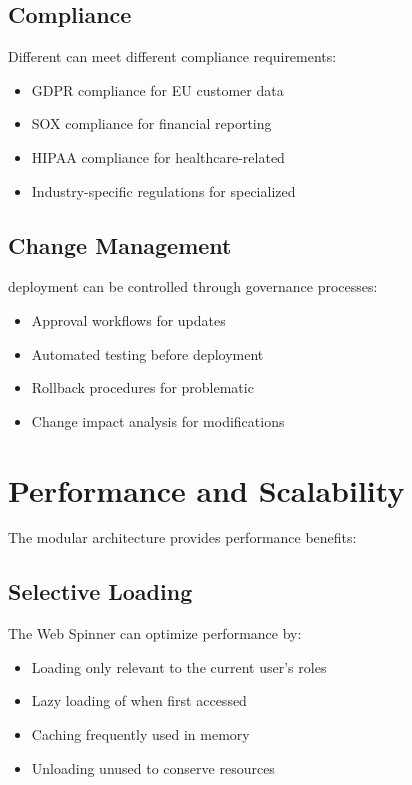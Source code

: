 \subsection{Compliance}

Different  can meet different compliance requirements:
\begin{itemize}
\item GDPR compliance for EU customer data 
\item SOX compliance for financial reporting 
\item HIPAA compliance for healthcare-related 
\item Industry-specific regulations for specialized 
\end{itemize}

\subsection{Change Management}

\webbaselet{} deployment can be controlled through governance processes:
\begin{itemize}
\item Approval workflows for \webbaselet{} updates
\item Automated testing before \webbaselet{} deployment
\item Rollback procedures for problematic 
\item Change impact analysis for \webbaselet{} modifications
\end{itemize}

\section{Performance and Scalability}
\label{sec:performance-scalability}

The modular architecture provides performance benefits:

\subsection{Selective Loading}

The Web Spinner can optimize performance by:
\begin{itemize}
\item Loading only  relevant to the current user's roles
\item Lazy loading of  when first accessed
\item Caching frequently used  in memory
\item Unloading unused  to conserve resources
\end{itemize}

